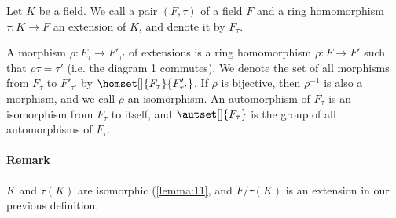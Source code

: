 \begin{definition}
  \label{def:89}
  Let $K$ be a field. We call a pair $(F, \tau)$ of a field $F$ and a ring homomorphism $\tau : K \rightarrow F$ an extension of $K$, and denote it by $F_\tau$. 

A morphism $\rho : F_\tau \rightarrow F'_{\tau'}$ of extensions is a ring homomorphism $\rho : F \rightarrow F'$ such that $\rho\tau = \tau'$ (i.e. the diagram 1 commutes). We denote the set of all morphisms from $F_\tau$ to $F'_{\tau'}$ by $\homset[]{F_\tau}{F'_{\tau'}}$. If $\rho$ is bijective, then $\rho^{-1}$ is also a morphism, and we call $\rho$ an isomorphism. An automorphism of $F_\tau$ is an isomorphism from $F_\tau$ to itself, and $\autset[]{F_\tau}$ is the group of all automorphisms of $F_\tau$.
\end{definition}

\paragraph{Remark}

$K$ and $\tau(K)$ are isomorphic (\autoref{lemma:11}, and $F/\tau(K)$ is an extension in our previous definition.

